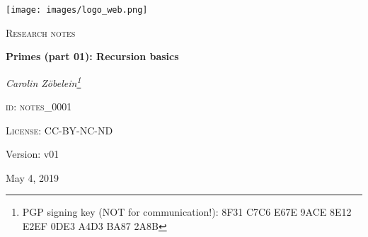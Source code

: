

\begin{titlepage}
	\begin{center}
    \begin{center}
            \texttt{[image: images/logo\_web.png]}
    \end{center}
    \vspace{1cm}
	{\scshape\Large Research notes\par}
	\vspace{1.5cm}
	{\huge\bfseries Primes (part 01): Recursion basics\par}
	\vspace{2cm}
	{\Large\itshape Carolin Z\"obelein\footnote{PGP signing key (NOT for communication!): 8F31 C7C6 E67E 9ACE 8E12 E2EF 0DE3 A4D3 BA87 2A8B}\par}
	\vfill
	\textsc{id: notes\_0001}\par
	\textsc{License: CC-BY-NC-ND}
	\vfill


	\vfill

	{\large Version: v01\par}
	{\large May 4, 2019\par}
	\end{center}
\end{titlepage}

